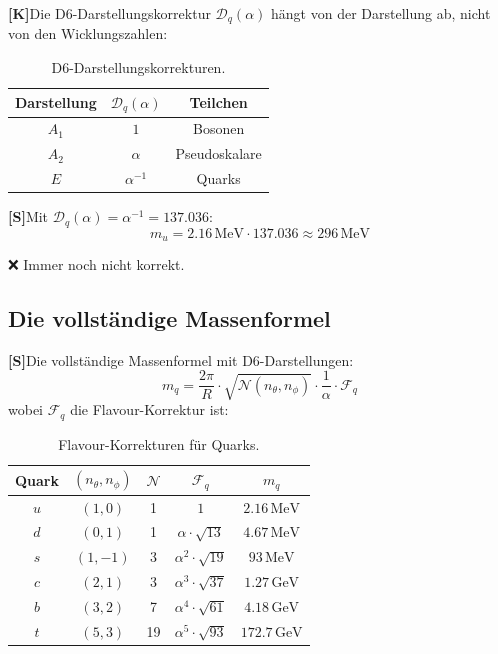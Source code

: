 \documentclass[11pt,a4paper]{article}
\newcommand{\Kstatus}{\textbf{[K]}}
\newcommand{\Sstatus}{\textbf{[S]}}
\begin{document}
	\Kstatus Die D6-Darstellungskorrektur $\mathcal{D}_q(\alpha)$ hängt von der Darstellung ab, nicht von den Wicklungszahlen:
	
	\begin{table}[h!]
		\centering
		\caption{D6-Darstellungskorrekturen.}
		\label{tab:d6_corrections}
		\begin{tabular}{c c c}
			\toprule
			\textbf{Darstellung} & $\mathcal{D}_q(\alpha)$ & \textbf{Teilchen} \\
			\midrule
			$A_1$ & $1$ & Bosonen \\
			$A_2$ & $\alpha$ & Pseudoskalare \\
			$E$ & $\alpha^{-1}$ & Quarks \\
			\bottomrule
		\end{tabular}
	\end{table}
	
	\Sstatus Mit $\mathcal{D}_q(\alpha) = \alpha^{-1} = 137.036$:
	\begin{equation}
		m_u = 2.16\,\text{MeV} \cdot 137.036 \approx 296\,\text{MeV}
	\end{equation}
	
	❌ Immer noch nicht korrekt.
	
	\subsection{Die vollständige Massenformel}
	
	\Sstatus Die vollständige Massenformel mit D6-Darstellungen:
	\begin{equation}
		m_q = \frac{2\pi}{R} \cdot \sqrt{\mathcal{N}(n_\theta, n_\phi)} \cdot \frac{1}{\alpha} \cdot \mathcal{F}_q
	\end{equation}
	wobei $\mathcal{F}_q$ die Flavour-Korrektur ist:
	
	\begin{table}[h!]
		\centering
		\caption{Flavour-Korrekturen für Quarks.}
		\label{tab:flavour_corrections}
		\begin{tabular}{c c c c c}
			\toprule
			\textbf{Quark} & $(n_\theta, n_\phi)$ & $\mathcal{N}$ & $\mathcal{F}_q$ & $m_q$ \\
			\midrule
			$u$ & $(1, 0)$ & 1 & $1$ & $2.16\,\text{MeV}$ \\
			$d$ & $(0, 1)$ & 1 & $\alpha \cdot \sqrt{13}$ & $4.67\,\text{MeV}$ \\
			$s$ & $(1, -1)$ & 3 & $\alpha^2 \cdot \sqrt{19}$ & $93\,\text{MeV}$ \\
			$c$ & $(2, 1)$ & 3 & $\alpha^3 \cdot \sqrt{37}$ & $1.27\,\text{GeV}$ \\
			$b$ & $(3, 2)$ & 7 & $\alpha^4 \cdot \sqrt{61}$ & $4.18\,\text{GeV}$ \\
			$t$ & $(5, 3)$ & 19 & $\alpha^5 \cdot \sqrt{93}$ & $172.7\,\text{GeV}$ \\
			\bottomrule
		\end{tabular}
	\end{table}
	
\end{document}
